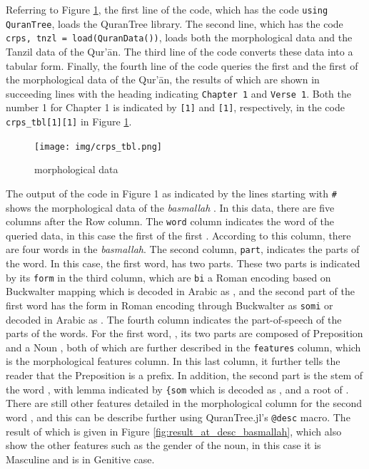 Referring to Figure \ref{fig:result_crps_tbl}, the first line of the code, which has the code \texttt{using QuranTree}, loads the QuranTree library. The second line, which has the code \texttt{crps, tnzl = load(QuranData())}, loads both the morphological data and the Tanzil data of the Qur'\=an. The third line of the code converts these data into a tabular form. Finally, the fourth line of the code queries the first   and the first   of the morphological data of the Qur'\=an, the results of which are shown in succeeding lines with the heading indicating \texttt{Chapter 1} and \texttt{Verse 1}. Both the number 1 for Chapter 1 is indicated by \texttt{[1]} and \texttt{[1]}, respectively, in the code \verb|crps_tbl[1][1]| in Figure \ref{fig:result_crps_tbl}.

\begin{figure}[!t]
    \centering
    \texttt{[image: img/crps\_tbl.png]}
    \caption{  morphological data}
    \label{fig:result_crps_tbl}
\end{figure}

The output of the code in Figure 1 as indicated by the lines starting with \texttt{\#} shows the morphological data of the \textit{basmallah} . In this data, there are five columns after the Row column. The \texttt{word} column indicates the word of the queried data, in this case the first   of the first  . According to this column, there are four words in the \textit{basmallah}. The second column, \texttt{part}, indicates the parts of the word. In this case, the first word, has two parts. These two parts is indicated by its \texttt{form} in the third column, which are \texttt{bi} a Roman encoding based on Buckwalter mapping which is decoded in Arabic as , and the second part of the first word has the form in Roman encoding through Buckwalter as \texttt{somi} or decoded in Arabic as . The fourth column indicates the part-of-speech of the parts of the words. For the first word, , its two parts are composed of Preposition  and a Noun , both of which are further described in the \texttt{features} column, which is the morphological features column. In this last column, it further tells the reader that the Preposition  is a prefix. In addition, the second part  is the stem of the word , with lemma indicated by \texttt{\{som} which is decoded as , and a root of . There are still other features detailed in the morphological column for the second word , and this can be describe further using QuranTree.jl's \texttt{@desc} macro. The result of which is given in Figure \ref{fig:result_at_desc_basmallah}, which also show the other features such as the gender of the noun, in this case it is Masculine and is in Genitive case.

